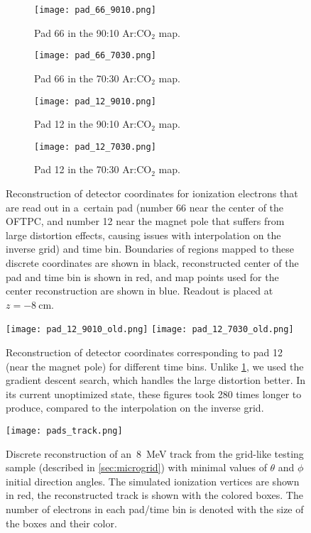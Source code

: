 		\begin{figure}
			\centering
			\begin{subfigure}[t]{0.48\textwidth}
				\centering
				\texttt{[image: pad\_66\_9010.png]}
				\caption{Pad 66 in the 90:10 Ar:CO$_2$ map.}
			\end{subfigure}
			\hfill
			\begin{subfigure}[t]{0.48\textwidth}
				\centering
				\texttt{[image: pad\_66\_7030.png]}
				\caption{Pad 66 in the 70:30 Ar:CO$_2$ map.}
			\end{subfigure}
			\begin{subfigure}[t]{0.48\textwidth}
				\centering
				\texttt{[image: pad\_12\_9010.png]}
				\caption{Pad 12 in the 90:10 Ar:CO$_2$ map.}
			\end{subfigure}
			\hfill
			\begin{subfigure}[t]{0.48\textwidth}
				\centering
				\texttt{[image: pad\_12\_7030.png]}
				\caption{Pad 12 in the 70:30 Ar:CO$_2$ map.}
			\end{subfigure}
			\caption{Reconstruction of detector coordinates for ionization electrons that are read out in a~certain pad (number 66 near the center of the \ac{OFTPC}, and number 12 near the magnet pole that suffers from large distortion effects, causing issues with interpolation on the inverse grid) and time bin. Boundaries of regions mapped to these discrete coordinates are shown in black, reconstructed center of the pad and time bin is shown in red, and map points used for the center reconstruction are shown in blue. Readout is placed at $z = \qty{-8}{\cm}$.}
			\label{fig:pad_reco}	
		\end{figure}
		
		\begin{figure}
			\centering
			\texttt{[image: pad\_12\_9010\_old.png]}
			\hfill
			\texttt{[image: pad\_12\_7030\_old.png]}
			\caption{Reconstruction of detector coordinates corresponding to pad 12 (near the magnet pole) for different time bins. Unlike \cref{fig:pad_reco}, we used the gradient descent search, which handles the large distortion better. In its current unoptimized state, these figures took 280 times longer to produce, compared to the interpolation on the inverse grid.}
			\label{fig:pad_reco_old}
		\end{figure}
		
		\begin{figure}
			\centering
			\texttt{[image: pads\_track.png]}
			\caption{Discrete reconstruction of an~\qty{8}{\MeV} track from the grid-like testing sample (described in \cref{sec:microgrid}) with minimal values of $\theta$ and $\phi$ initial direction angles. The simulated ionization vertices are shown in red, the reconstructed track is shown with the colored boxes. The number of electrons in each pad/time bin is denoted with the size of the boxes and their color.}
			\label{fig:pad_track}
		\end{figure}